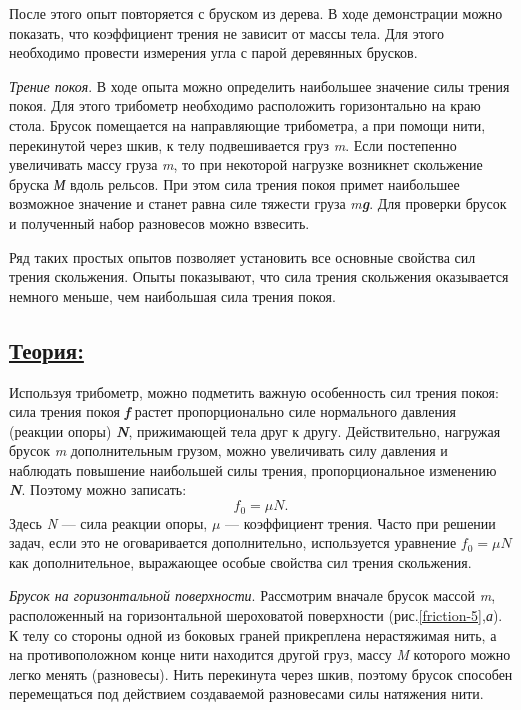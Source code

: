 \documentclass[14pt,a4paper,oneside]{extarticle}	%
\begin{document}
	После этого опыт повторяется с бруском из дерева.
	В ходе демонстрации можно показать, что коэффициент трения не зависит от массы тела.
	Для этого необходимо провести измерения угла с парой деревянных брусков.
	
	\textit{Трение покоя}.	
    В ходе опыта можно определить наибольшее значение силы трения покоя.
    Для этого трибометр необходимо расположить горизонтально на краю стола.
    Брусок помещается на направляющие трибометра, а при помощи нити, перекинутой через шкив, к телу подвешивается груз \textit{m}.
	Если постепенно увеличивать массу груза \textit{m}, то при некоторой нагрузке возникнет скольжение бруска \textit{М} вдоль рельсов. 
	При этом сила трения покоя примет наибольшее возможное значение и станет равна 
	силе тяжести груза \textit{m\textbf{g}}.
	Для проверки брусок и полученный набор разновесов можно взвесить.
	
	Ряд таких простых опытов позволяет установить все основные 
	свойства сил трения скольжения. 
	Опыты показывают, что сила трения скольжения оказывается немного меньше, чем наибольшая 
	сила трения покоя. 

	\subsection*{\underline{Теория:}}
	
	Используя трибометр, можно подметить важную особенность сил трения покоя: сила трения покоя \textit{\textbf{f}} растет пропорционально силе нормального давления (реакции опоры)
	\textit{\textbf{N}}, прижимающей тела друг к другу. 
	Действительно, нагружая брусок \textit{m} дополнительным грузом, можно увеличивать 
	силу давления и наблюдать повышение наибольшей силы трения, пропорциональное изменению \textit{\textbf{N}}. 
	Поэтому можно записать: 
	\begin{equation}\label{friction-4eq1}
	f_0  = \mu N.
	\end{equation}
	Здесь \textit{N} — сила реакции опоры, $ \mu $ — коэффициент трения.
	Часто при решении задач, если это не оговаривается дополнительно, используется уравнение $ f_0 = \mu N $ как дополнительное, выражающее особые свойства сил трения скольжения. 

\textit{Брусок на горизонтальной поверхности}.
Рассмотрим вначале брусок массой \textit{m}, расположенный на горизонтальной шероховатой поверхности (рис.\ref{friction-5},\textit{а}).
К телу со стороны одной из боковых граней прикреплена нерастяжимая нить, а на противоположном конце нити находится другой груз, массу \textit{M} которого можно легко менять (разновесы).
Нить перекинута через шкив, поэтому брусок способен перемещаться под действием создаваемой разновесами силы натяжения нити.
\end{document}
